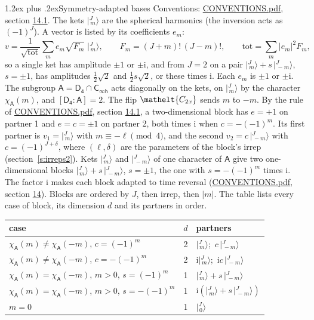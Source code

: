 \documentclass[10pt,a4paper]{article}
\makeatletter
\renewcommand\section{\@startsection{section}{1}{\z@}{-3ex plus -1ex minus -.2ex}%
  {1.2ex plus .2ex}{\normalfont\large\sffamily\bfseries\color{parttitle}}}
\numberwithin{equation}{section}
\newcommand{\eltfont}[1]{{\let\sigma\eltsigma\mathelt{#1}}}
\newcommand{\grp}[1]{\mathsf{#1}}
\newcommand{\elt}[1]{\eltfont{#1}}
\newcommand{\grpindex}[2]{[#1 : #2]}
\newcommand{\iunit}{\mathrm{i}}
\newcommand{\chiA}{\chi_{\grp{A}}}
\newcommand{\jm}[2]{\bigl\lvert{}^{#1}_{\,#2}\bigr\rangle}
\makeatother
\begin{document}
\section{Symmetry-adapted bases}\label{s:bases}
Conventions: \href{../../CONVENTIONS.pdf}{CONVENTIONS.pdf}, section \href{../../CONVENTIONS.pdf\#conv.14.1}{14.1}.
\leavevmode\label{n:index.m}\label{n:vector.ket}The kets $\jm{J}{m}$ are the spherical harmonics (the inversion acts as $(-1)^J$). \label{n:index.ketcoefficient}\label{n:vector.basis.symmetry}\label{n:index.ketweight}\label{n:index.total}A vector is listed by its coefficients $e_m$:
\begin{equation}\label{e:ket}v = \frac{1}{\sqrt{\mathrm{tot}}}\sum_m e_m\sqrt{F_m}\;\jm{J}{m},\qquad F_m = (J+m)!\,(J-m)!,\qquad \mathrm{tot} = \sum_m |e_m|^2F_m,\end{equation}
\leavevmode\label{n:index.pair.sign}so a single ket has amplitude $\pm1$ or $\pm\iunit$, and from $J = 2$ on a pair $\jm{J}{m} + s\,\jm{J}{-m}$, $s = \pm1$, has amplitudes $\tfrac{1}{2}\sqrt{2}$ and $\tfrac{1}{2}s\sqrt{2}$, or these times $\iunit$. Each $e_m$ is $\pm1$ or $\pm\iunit$.
\leavevmode\label{n:group.A}\label{n:function.character.abelian}The subgroup $\grp{A} = \grp{D_{4}}\cap\grp{C_{\infty h}}$ acts diagonally on the kets, on $\jm{J}{m}$ by the character $\chiA(m)$, and $\grpindex{\grp{D_{4}}}{\grp{A}} = 2$. The flip $\elt{C_{2x}}$ sends $m$ to $-m$. \label{n:index.partner.sign}By the rule of \href{../../CONVENTIONS.pdf}{CONVENTIONS.pdf}, section \href{../../CONVENTIONS.pdf\#conv.14.1}{14.1}, a two-dimensional block has $e = +1$ on partner 1 and $e = c = \pm1$ on partner 2, both times $\iunit$ when $c = -(-1)^m$. Its first partner is $v_1 = \jm{J}{m}$ with $m \equiv -\ell \pmod{4}$, and the second $v_2 = c\,\jm{J}{-m}$ with $c = (-1)^{J+\delta}$, where $(\ell, \delta)$ are the parameters of the block's irrep (section~\ref{s:irreps2}). Kets $\jm{J}{m}$ and $\jm{J}{-m}$ of one character of $\grp{A}$ give two one-dimensional blocks $\jm{J}{m} + s\,\jm{J}{-m}$, $s = \pm1$, the one with $s = -(-1)^m$ times $\iunit$. The factor $\iunit$ makes each block adapted to time reversal (\href{../../CONVENTIONS.pdf}{CONVENTIONS.pdf}, section \href{../../CONVENTIONS.pdf\#conv.14}{14}). Blocks are ordered by $J$, then irrep, then $|m|$.
\leavevmode\label{n:head.case}\label{n:head.partners}The table lists every case of block, its dimension $d$ and its partners in order.
\begin{center}\begin{tabular}{@{}lrl@{}}\toprule
case & $d$ & partners\\\midrule
$\chiA(m) \ne \chiA(-m)$, $c = (-1)^m$ & 2 & $\jm{J}{m}$;\ $c\,\jm{J}{-m}$\\
$\chiA(m) \ne \chiA(-m)$, $c = -(-1)^m$ & 2 & $\iunit\jm{J}{m}$;\ $\iunit c\,\jm{J}{-m}$\\
$\chiA(m) = \chiA(-m)$, $m > 0$, $s = (-1)^m$ & 1 & $\jm{J}{m} + s\,\jm{J}{-m}$\\
$\chiA(m) = \chiA(-m)$, $m > 0$, $s = -(-1)^m$ & 1 & $\iunit(\jm{J}{m} + s\,\jm{J}{-m})$\\
$m = 0$ & 1 & $\jm{J}{0}$\\
\bottomrule\end{tabular}\end{center}
\end{document}
